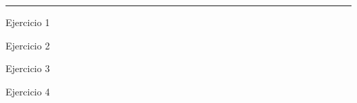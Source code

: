 \documentclass[
  spanish,
  12pt,
]{article}
\author{}
\date{\vspace{-2.5em}}
\begin{document}
{
\setcounter{tocdepth}{2}
\tableofcontents
}
\begin{center}\rule{0.5\linewidth}{0.5pt}\end{center}

\newpage

Ejercicio 1

Ejercicio 2

Ejercicio 3

Ejercicio 4
\end{document}

